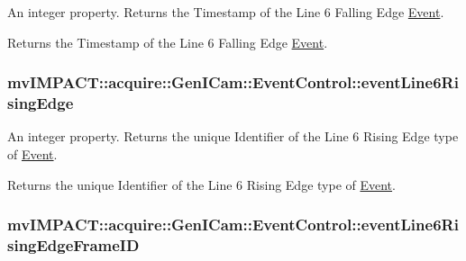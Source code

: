 An integer property. Returns the Timestamp of the Line 6 Falling Edge \hyperlink{classmv_i_m_p_a_c_t_1_1acquire_1_1_event}{Event}. 

Returns the Timestamp of the Line 6 Falling Edge \hyperlink{classmv_i_m_p_a_c_t_1_1acquire_1_1_event}{Event}. \hypertarget{classmv_i_m_p_a_c_t_1_1acquire_1_1_gen_i_cam_1_1_event_control_ad309edbdca41d97cd6b28258d1d78c47}{
\subsubsection[{event\+Line6\+Rising\+Edge}]{ mv\+I\+M\+P\+A\+C\+T\+::acquire\+::\+Gen\+I\+Cam\+::\+Event\+Control\+::event\+Line6\+Rising\+Edge}}\label{classmv_i_m_p_a_c_t_1_1acquire_1_1_gen_i_cam_1_1_event_control_ad309edbdca41d97cd6b28258d1d78c47}


An integer property. Returns the unique Identifier of the Line 6 Rising Edge type of \hyperlink{classmv_i_m_p_a_c_t_1_1acquire_1_1_event}{Event}. 

Returns the unique Identifier of the Line 6 Rising Edge type of \hyperlink{classmv_i_m_p_a_c_t_1_1acquire_1_1_event}{Event}. \hypertarget{classmv_i_m_p_a_c_t_1_1acquire_1_1_gen_i_cam_1_1_event_control_a3460bfb68321a164f5aac51fd6690fc6}{
\subsubsection[{event\+Line6\+Rising\+Edge\+Frame\+I\+D}]{ mv\+I\+M\+P\+A\+C\+T\+::acquire\+::\+Gen\+I\+Cam\+::\+Event\+Control\+::event\+Line6\+Rising\+Edge\+Frame\+I\+D}}\label{classmv_i_m_p_a_c_t_1_1acquire_1_1_gen_i_cam_1_1_event_control_a3460bfb68321a164f5aac51fd6690fc6}


